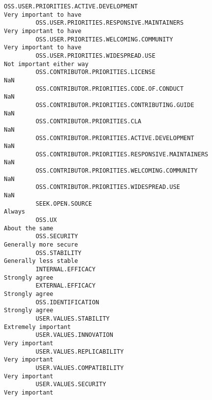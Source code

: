 \documentclass[11pt]{article}
\begin{document}
\begin{Verbatim}[commandchars=\\\{\}]
         OSS.USER.PRIORITIES.ACTIVE.DEVELOPMENT                                        Very important to have   
         OSS.USER.PRIORITIES.RESPONSIVE.MAINTAINERS                                    Very important to have   
         OSS.USER.PRIORITIES.WELCOMING.COMMUNITY                                       Very important to have   
         OSS.USER.PRIORITIES.WIDESPREAD.USE                                          Not important either way   
         OSS.CONTRIBUTOR.PRIORITIES.LICENSE                                                               NaN   
         OSS.CONTRIBUTOR.PRIORITIES.CODE.OF.CONDUCT                                                       NaN   
         OSS.CONTRIBUTOR.PRIORITIES.CONTRIBUTING.GUIDE                                                    NaN   
         OSS.CONTRIBUTOR.PRIORITIES.CLA                                                                   NaN   
         OSS.CONTRIBUTOR.PRIORITIES.ACTIVE.DEVELOPMENT                                                    NaN   
         OSS.CONTRIBUTOR.PRIORITIES.RESPONSIVE.MAINTAINERS                                                NaN   
         OSS.CONTRIBUTOR.PRIORITIES.WELCOMING.COMMUNITY                                                   NaN   
         OSS.CONTRIBUTOR.PRIORITIES.WIDESPREAD.USE                                                        NaN   
         SEEK.OPEN.SOURCE                                                                              Always   
         OSS.UX                                                                                About the same   
         OSS.SECURITY                                                                   Generally more secure   
         OSS.STABILITY                                                                  Generally less stable   
         INTERNAL.EFFICACY                                                                     Strongly agree   
         EXTERNAL.EFFICACY                                                                     Strongly agree   
         OSS.IDENTIFICATION                                                                    Strongly agree   
         USER.VALUES.STABILITY                                                            Extremely important   
         USER.VALUES.INNOVATION                                                                Very important   
         USER.VALUES.REPLICABILITY                                                             Very important   
         USER.VALUES.COMPATIBILITY                                                             Very important   
         USER.VALUES.SECURITY                                                                  Very important   

\end{Verbatim}
\end{document}
